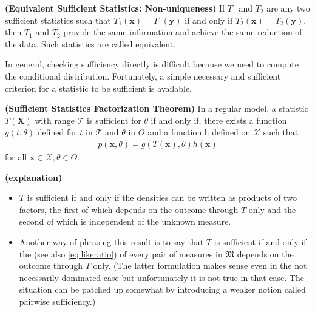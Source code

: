 \documentclass{article}
\newcommand{\bfs}[1]{\textbf{({#1}) }}
\begin{document}
\begin{defa}\bfs{Equivalent Sufficient Statistics: Non-uniqueness}
 If $T_{1}$ and $T_{2}$ are any two sufficient statistics such that $T_{1}(\mathbf{x})=T_{1}(\mathbf{y})$ if and only if $T_{2}(\mathbf{x})=T_{2}(\mathbf{y})$, then $T_{1}$ and $T_{2}$ provide the same information and achieve the same reduction of the data. Such statistics are called equivalent.
\end{defa}


In general, checking sufficiency directly is difficult because we need to compute the conditional distribution. Fortunately, a simple necessary and sufficient criterion for a statistic to be sufficient is available. 

\begin{thma}\bfs{Sufficient Statistics Factorization Theorem}\label{thm:frac}
In a regular model, a statistic $T(\mathbf{X})$ with range $\mathcal{T}$ is sufficient for $\theta$ if and only if, there exists a function $g(t, \theta)$ defined for $t$ in $\mathcal{T}$ and $\theta$ in $\Theta$ and a function h defined on $\mathcal{X}$ such that
\begin{align}
p(\mathbf{x}, \theta)=g(T(\mathbf{x}), \theta) h(\mathbf{x}) \label{eq:nmdfae}
\end{align}
for all $\mathbf{x} \in \mathcal{X}, \theta \in \Theta$.
\end{thma}
\begin{rema}\bfs{explanation}
\begin{itemize}
    \item $T$ is sufficient if and only if the densities can be written as products of two factors, the first of which depends on the outcome through $T$ only and the second of which is independent of the unknown measure. 
    \item Another way of phrasing this result is to say that $T$ is sufficient if and only if the  (see also \cref{eq:likeratio}) of every pair of measures in $\mathfrak{M}$ depends on the outcome through $T$ only. (The latter formulation makes sense even in the not necessarily dominated case but unfortunately it is not true in that case. The situation can be patched up somewhat by introducing a weaker notion called pairwise sufficiency.)
\end{itemize}
\end{rema}
\end{document}
